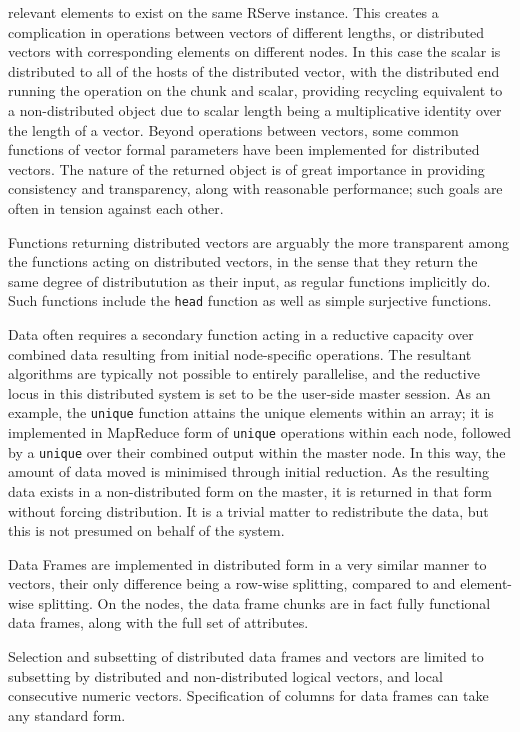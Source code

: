relevant elements to exist on the same RServe instance. This creates a
complication in operations between vectors of different lengths, or
distributed vectors with corresponding elements on different nodes. In
this case the scalar is distributed to all of the hosts of the
distributed vector, with the distributed end running the operation on
the chunk and scalar, providing recycling equivalent to a
non-distributed object due to scalar length being a multiplicative
identity over the length of a vector. Beyond operations between vectors,
some common functions of vector formal parameters have been implemented
for distributed vectors. The nature of the returned object is of great
importance in providing consistency and transparency, along with
reasonable performance; such goals are often in tension against each
other.

Functions returning distributed vectors are arguably the more
transparent among the functions acting on distributed vectors, in the
sense that they return the same degree of distributution as their input,
as regular \R functions implicitly do. Such functions include the
\texttt{head} function as well as simple surjective functions.

Data often requires a secondary function acting in a reductive capacity
over combined data resulting from initial node-specific operations. The
resultant algorithms are typically not possible to entirely parallelise,
and the reductive locus in this distributed system is set to be the
user-side master \R session. As an example, the \texttt{unique} function
attains the unique elements within an array; it is implemented in
MapReduce form of \texttt{unique} operations within each node, followed
by a \texttt{unique} over their combined output within the master node.
In this way, the amount of data moved is minimised through initial
reduction. As the resulting data exists in a non-distributed form on the
master, it is returned in that form without forcing distribution. It is
a trivial matter to redistribute the data, but this is not presumed on
behalf of the system.

Data Frames are implemented in distributed form in a very similar manner
to vectors, their only difference being a row-wise splitting, compared
to and element-wise splitting. On the nodes, the data frame chunks are
in fact fully functional data frames, along with the full set of
attributes.

Selection and subsetting of distributed data frames and vectors are
limited to subsetting by distributed and non-distributed logical
vectors, and local consecutive numeric vectors. Specification of columns
for data frames can take any standard form.

